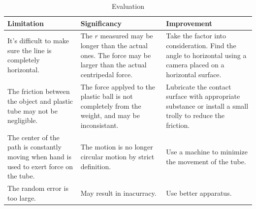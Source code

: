 \documentclass[a4paper]{article}
\begin{document}
\begin{table}[!ht]
    \centering
    \caption{Evaluation }\label{tab:dummy-1}
    
      \begin{tabularx}{\textwidth} {XXX}
        \hline
        \hline
        \textbf{Limitation} & \textbf{Significancy} & \textbf{Improvement} \\
        \hline
        It's difficult to make sure the line is completely horizontal. & The $r$ measured may be longer than the actual ones. The force may be larger than the actual centripedal force.  & Take the factor into consideration. Find the angle to horizontal using a camera placed on a horizontal surface.\\
        The friction between the object and plastic tube may not be negligible. & The force applyed to the plastic ball is not completely from the weight, and may be inconsistant. & Lubricate the contact surface with appropriate substance or install a small trolly to reduce the friction. \\
        The center of the path is constantly moving when hand is used to exert force on the tube. & The motion is no longer circular motion by strict definition. & Use a machine to minimize the movement of the tube.\\
        The random error is too large. & May result in inacurracy. & Use better apparatus.\\
        \hline
        \hline
      \end{tabularx}
    
  \end{table}
\end{document}
